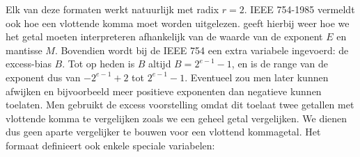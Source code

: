 Elk van deze formaten werkt natuurlijk met radix $r=2$. IEEE 754-1985 vermeldt ook hoe een vlottende komma moet worden uitgelezen.  geeft hierbij weer hoe we het getal moeten interpreteren afhankelijk van de waarde van de exponent $E$ en mantisse $M$. Bovendien wordt bij de IEEE 754 een extra variabele ingevoerd: de excess-bias $B$. Tot op heden is $B$ altijd $B=2^{e-1}-1$, en is de range van de exponent dus van $-2^{e-1}+2$ tot $2^{e-1}-1$. Eventueel zou men later kunnen afwijken en bijvoorbeeld meer positieve exponenten dan negatieve kunnen toelaten. Men gebruikt de excess voorstelling omdat dit toelaat twee getallen met vlottende komma te vergelijken zoals we een geheel getal vergelijken. We dienen dus geen aparte vergelijker te bouwen voor een vlottend kommagetal. Het formaat definieert ook enkele speciale variabelen:
